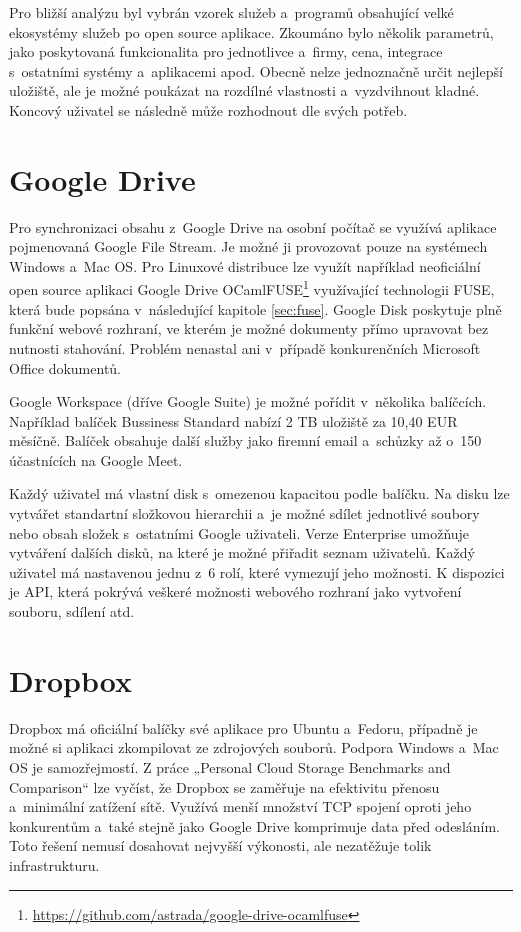 Pro bližší analýzu byl vybrán vzorek služeb a programů obsahující velké ekosystémy služeb po open source aplikace. Zkoumáno bylo několik parametrů,
jako poskytovaná funkcionalita pro jednotlivce a firmy, cena, integrace s ostatními systémy a aplikacemi apod. Obecně nelze jednoznačně určit nejlepší uložiště, 
ale je možné poukázat na rozdílné vlastnosti a vyzdvihnout kladné. Koncový uživatel se následně může rozhodnout dle svých potřeb.

\section{Google Drive}

Pro synchronizaci obsahu z Google Drive na osobní počítač se využívá aplikace pojmenovaná Google File Stream. Je možné ji provozovat pouze na systémech
Windows a Mac OS.\cite{GoogleFileStream} Pro Linuxové distribuce lze využít například neoficiální open source aplikaci 
Google Drive OCamlFUSE\footnote{\url{https://github.com/astrada/google-drive-ocamlfuse}} využívající technologii
FUSE, která bude popsána v následující kapitole \ref{sec:fuse}. Google Disk poskytuje plně funkční webové rozhraní,
ve kterém je možné dokumenty přímo upravovat bez nutnosti stahování. Problém nenastal ani v případě konkurenčních Microsoft Office dokumentů. 

Google Workspace (dříve Google Suite) je možné pořídit v několika balíčcích. Například balíček Bussiness Standard nabízí 2 TB uložiště za 10,40 EUR měsíčně.
Balíček obsahuje další služby jako firemní email a schůzky až o 150 účastnících na Google Meet.\cite{GoogleWorkspace}

Každý uživatel má vlastní disk s omezenou kapacitou podle balíčku. Na disku lze vytvářet standartní složkovou hierarchii a je možné sdílet jednotlivé soubory nebo
obsah složek s ostatními Google uživateli. Verze Enterprise umožňuje vytváření dalších disků, na které je možné přiřadit seznam uživatelů. Každý uživatel
má nastavenou jednu z 6 rolí, které vymezují jeho možnosti. K dispozici je API, která pokrývá veškeré možnosti webového rozhraní jako vytvoření souboru,
sdílení atd.\cite{GoogleAPIReference}

\section{Dropbox}

Dropbox má oficiální balíčky své aplikace pro Ubuntu a Fedoru, případně je možné si aplikaci zkompilovat ze zdrojových souborů. Podpora Windows a Mac OS je samozřejmostí.
Z práce „Personal Cloud Storage Benchmarks and Comparison“ lze vyčíst, že Dropbox se zaměřuje na efektivitu přenosu a minimální zatížení sítě.
Využívá menší množství TCP spojení oproti jeho konkurentům a také stejně jako Google Drive komprimuje data před odesláním.\cite{CloudStorageComparison}
Toto řešení nemusí dosahovat nejvyšší výkonosti, ale nezatěžuje tolik infrastrukturu. 


